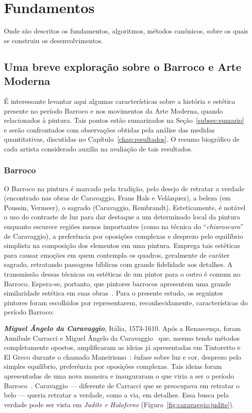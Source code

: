 \afterpage{\blankpage}
\chapter{Fundamentos}
\label{cap:fundamentos}

Onde são descritos os fundamentos, algoritmos, métodos canônicos,
sobre os quais se construiu os desenvolvimentos.

\section{Uma breve exploração sobre o Barroco e Arte Moderna}
\label{sec:breve}

É interessante levantar aqui algumas características sobre a história
e estética presente no período Barroco e nos movimentos da Arte
Moderna, quando relacionados à pintura. Tais pontos estão sumarizados
na Seção~\ref{subsec:sumario} e serão confrontados com observações
obtidas pela análise das medidas quantitativas, discutidas no
Capítulo~\ref{chap:resultados}. O resumo biográfico de cada artista
considerado auxilia na avaliação de tais resultados.

\subsection{Barroco}

O Barroco na pintura é marcado pela tradição, pelo desejo de retratar
a verdade (encontrado nas obras de Caravaggio, Frans Hals e
Velázquez), a beleza (em Poussin, Vermeer), o sagrado (Caravaggio,
Rembrandt). Esteticamente, é notável o uso do contraste de luz para
dar destaque a um determinado local da pintura enquanto escurece
regiões menos importantes (como na técnica do ``\textit{chiaroscuro}''
de Caravaggio), a preferência por oposições complexas e desprezo pelo
equilíbrio simplista na composição dos elementos em uma
pintura. Emprega tais estéticas para causar emoções em quem contempla
os quadros, geralmente de caráter sagrado, retratando passagens
bíblicas com grande fidelidade aos detalhes. A transmissão dessas
técnicas ou estéticas de um pintor para o outro é comum no
Barroco. Espera-se, portanto, que pintores barrocos apresentem uma
grande similaridade estética em suas
obras~\cite{gombrich,hills,gardner}. Para o presente estudo, os
seguintes pintores foram escolhidos por representarem,
reconhecidamente, características do período Barroco:

\textbf{\emph{Miguel Ângelo da Caravaggio}}, Itália, 1573-1610.  Após
a Renascença, foram Annibale Carracci e Miguel Ângelo da
Caravaggio~\cite{bayer} que, mesmo tendo métodos completamente
opostos, amplificaram as ideias já apresentadas em Tintoretto e El
Greco durante o chamado Maneirismo~\cite{tatarkiewicz}: ênfase sobre
luz e cor, desprezo pelo simples equilíbrio, preferência por oposições
complexas. Tais ideias foram apresentadas de uma nova maneira e
inauguraram o que viria a ser o período
Barroco~\cite{hills}. Caravaggio --- diferente de Carracci que se
preocupava em retratar o belo --- queria retratar a verdade, como a
via, em detalhes. Essa busca pela verdade pode ser vista em
\emph{Judite e Holoferne}
(Figura~\ref{fig:caravaggio:judite}).~\cite{puglisi,caravaggio}

